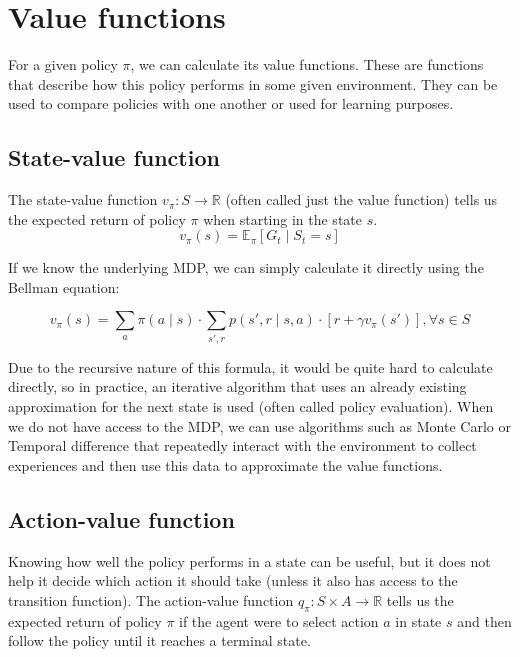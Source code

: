 \documentclass[
  digital,     %
  oneside,     %
  nosansbold,  %
  nocolorbold, %
  lof,         %
  lot,         %
]{fithesis4}
\begin{document}
\section{Value functions}

For a given policy $\pi$, we can calculate its value functions. These are functions that describe how this policy performs in some given environment. They can be used to compare policies with one another or used for learning purposes.

\subsection{State-value function}
\label{subsec:state_value_func}
The state-value function $v_\pi\colon S\to \mathbb{R}$ (often called just the value function) tells us the expected return of policy $\pi$ when starting in the state $s$.
\begin{equation}
v_\pi(s) = \mathbb{E}_\pi [G_t\mid S_t=s]
\end{equation}

If we know the underlying MDP, we can simply calculate it directly using the Bellman equation:

\begin{equation}
v_\pi(s) = \sum_a \pi(a\mid s) \cdot \sum_{s',r} p(s',r\mid s,a)\cdot[r+\gamma v_\pi(s')], \forall s \in S
\end{equation}

Due to the recursive nature of this formula, it would be quite hard to calculate directly, so in practice, an iterative algorithm that uses an already existing approximation for the next state is used (often called policy evaluation). When we do not have access to the MDP, we can use algorithms such as Monte Carlo or Temporal difference that repeatedly interact with the environment to collect experiences and then use this data to approximate the value functions.

\subsection{Action-value function}

Knowing how well the policy performs in a state can be useful, but it does not help it decide which action it should take (unless it also has access to the transition function). The action-value function $q_\pi\colon S \times A \to \mathbb{R}$ tells us the expected return of policy $\pi$ if the agent were to select action $a$ in state $s$ and then follow the policy until it reaches a terminal state.
\end{document}
